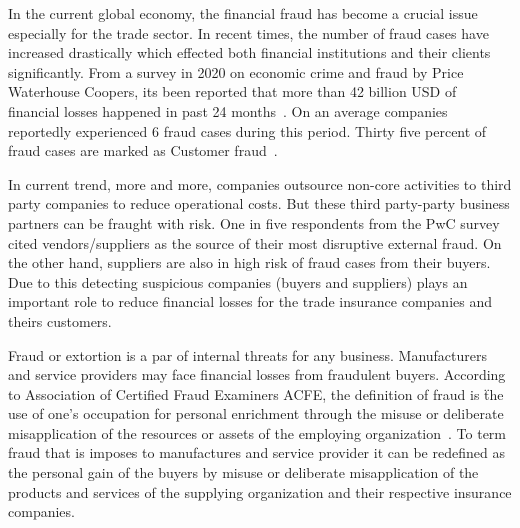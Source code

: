 
In the current global economy, the financial fraud has become a crucial issue especially for the trade sector. In recent times, the number of fraud cases have increased drastically which effected both financial institutions and their clients significantly. From a survey in 2020 on economic crime and fraud by Price Waterhouse Coopers, its been reported that more than 42 billion USD of financial losses happened in past 24 months~\cite{PwC.Crime.Survey}. On an average companies reportedly experienced 6 fraud cases during this period. Thirty five percent of fraud cases are marked as Customer fraud~\cite{PwC.Crime.Survey}.   

In current trend, more and more, companies outsource non-core activities to third party companies to reduce operational costs. But these third party-party business partners can be fraught with risk. One in five respondents from the PwC survey~\cite{PwC.Crime.Survey} cited vendors/suppliers as the source of their most disruptive external fraud. On the other hand, suppliers are also in high risk of fraud cases from their buyers. Due to this detecting suspicious companies (buyers and suppliers) plays an important role to reduce financial losses for the trade insurance companies and theirs customers.



Fraud or extortion is a par of internal threats for any business. Manufacturers and service providers may face financial losses from fraudulent buyers. According to Association of Certified Fraud Examiners ACFE, the definition of fraud is \"the use of one’s occupation for personal enrichment through the misuse or deliberate
misapplication of the resources or assets of the employing organization~\cite{kassem_2014}. To term fraud that is imposes to manufactures and service provider it can be redefined as the personal gain of the buyers by misuse or deliberate misapplication of the products and services of the supplying organization and their respective insurance companies.

